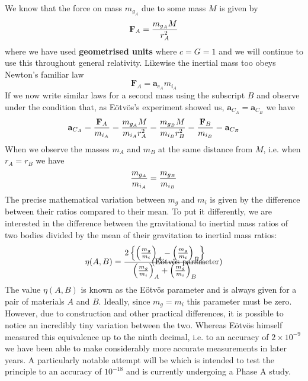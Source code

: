 \documentclass[english,seminar]{lecture}
\begin{document}
We know that the force on mass $m_{g_A}$ due to some mass $M$ is given by $$\mathbf{F}_A = {m_{g_A}M\over r_A^2}$$ where we have used \textbf{geometrised units} where $c = G = 1$ and we will continue to use this throughout general relativity. Likewise the inertial mass too obeys Newton's familiar law $$\mathbf{F}_A = \mathbf{a}_{c_A} m_{i_A}$$ If we now write similar laws for a second mass using the subscript $B$ and observe under the condition that, as E\"{o}tv\"{o}s's experiment showed us, $\mathbf{a}_{C_A} = \mathbf{a}_{C_B}$ we have $$\mathbf{a}_{C_A} = {\mathbf{F}_A \over m_{i_A}} = {m_{g_A}M \over m_{i_A}r_A^2} = {m_{g_B}M \over m_{i_B}r_B^2} = {\mathbf{F}_B \over m_{i_B}} = \mathbf{a}_{C_B}$$ When we observe the masses $m_A$ and $m_B$ at the same distance from $M$, i.e. when $r_A = r_B$ we have $${m_{g_A} \over m_{i_A}} = {m_{g_B} \over m_{i_B}}$$ The precise mathematical variation between $m_g$ and $m_i$ is given by the difference between their ratios compared to their mean. To put it differently, we are interested in the difference between the gravitational to inertial mass ratios of two bodies divided by the mean of their gravitation to inertial mass ratios:
\begin{align}
	\eta (A,B) = {2 \left\lbrace \left( {m_g \over m_i} \right)_A - \left( {m_g \over m_i} \right)_B \right\rbrace \over \left( {m_g \over m_i} \right)_A + \left( {m_g \over m_i} \right)_B } \hspace*{-3cm} \tag{E\"{o}tv\"{o}s parameter}\label{eq:eotvos-parameter} 
\end{align}%
The value $\eta (A,B)$ is known as the E\"{o}tv\"{o}s parameter and is always given for a pair of materials $A$ and $B$. Ideally, since $m_g = m_i$ this parameter must be zero. However, due to construction and other practical differences, it is possible to notice an incredibly tiny variation between the two. Whereas E\"{o}tv\"{o}s himself measured this equivalence up to the ninth decimal, i.e. to an accuracy of $2\times 10^{-9}$ we have been able to make considerably more accurate measurements in later years. A particularly notable attempt will be \cite{STEP} which is intended to test the principle to an accuracy of $10^{-18}$ and is currently undergoing a Phase A study.
\end{document}
